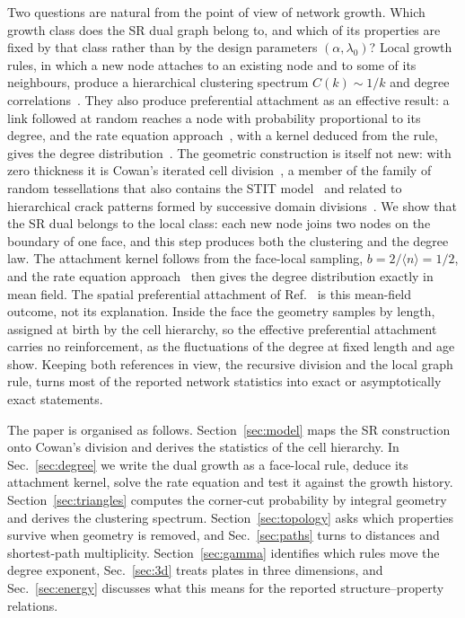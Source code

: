 \documentclass[pre,twocolumn,superscriptaddress,amsmath,amssymb,floatfix]{revtex4-2}
\begin{document}
Two questions are natural from the point of view of network growth. Which growth
class does the SR dual graph belong to, and which of its properties are fixed by
that class rather than by the design parameters $(\alpha,\lambda_0)$? Local growth
rules, in which a new node attaches to an existing node and to some of its
neighbours, produce a hierarchical clustering spectrum $C(k)\sim1/k$ and degree
correlations~\cite{vazquez2003,holme2002,dorogovtsev2001,ravasz2003}. They also
produce preferential attachment as an effective result: a link followed at random
reaches a node with probability proportional to its degree, and the rate equation
approach~\cite{krapivsky2000}, with a kernel deduced from the rule, gives the degree
distribution~\cite{vazquez2003}. The geometric construction is itself not new: with
zero thickness it is Cowan's iterated cell division~\cite{cowan2010}, a member of the
family of random tessellations that also contains the STIT
model~\cite{nagel2005,redenbach2025,*redenbach2025arxiv} and related to hierarchical crack patterns formed
by successive domain divisions~\cite{bohn2005,bohn2005b}. We show that the SR dual
belongs to the local class: each new node joins two nodes on the boundary of one face,
and this step produces both the clustering and the degree law. The attachment kernel
follows from the face-local sampling, $b=2/\langle n\rangle=1/2$, and the rate equation
approach~\cite{krapivsky2000} then gives the degree distribution exactly in mean field. The
spatial preferential attachment of Ref.~\cite{both2026} is this mean-field outcome, not
its explanation. Inside the face the geometry samples by length, assigned at birth by
the cell hierarchy, so the effective preferential attachment carries no reinforcement,
as the fluctuations of the degree at fixed length and age show. Keeping both references in view, the recursive division and the local graph
rule, turns most of the reported network statistics into exact or asymptotically exact
statements.

The paper is organised as follows. Section~\ref{sec:model} maps the SR construction
onto Cowan's division and derives the statistics of the cell hierarchy. In
Sec.~\ref{sec:degree} we write the dual growth as a face-local rule, deduce its
attachment kernel, solve the rate equation and test it against the growth history. Section~\ref{sec:triangles} computes the corner-cut probability
by integral geometry and derives the clustering spectrum. Section~\ref{sec:topology}
asks which properties survive when geometry is removed, and Sec.~\ref{sec:paths}
turns to distances and shortest-path multiplicity. Section~\ref{sec:gamma} identifies
which rules move the degree exponent, Sec.~\ref{sec:3d} treats plates in three
dimensions, and Sec.~\ref{sec:energy} discusses what this
means for the reported structure--property relations.
\end{document}
